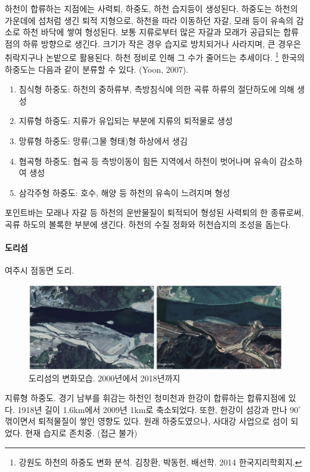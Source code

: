 하천이 합류하는 지점에는 사력퇴, 하중도, 하천 습지등이 생성된다.
하중도는 하천의 가운데에 섬처럼 생긴 퇴적 지형으로, 하천을 따라 이동하던 자갈, 모래 등이 유속의 감소로 하천 바닥에 쌓여 형성된다.
보통 지류로부터 많은 자갈과 모래가 공급되는 합류점의 하류 방향으로 생긴다.
크기가 작은 경우 습지로 방치되거나 사라지며, 큰 경우은 취락지구나 논밭으로 활용된다. 
하천 정비로 인해 그 수가 줄어드는 추세이다.
\footnote{강원도 하천의 하중도 변화 분석. 김창환, 박동헌, 배선학. 2014 한국지리학회지.}
한국의 하중도는 다음과 같이 분류할 수 있다. (Yoon, 2007).
\begin{enumerate}
    \item 침식형 하중도: 하천의 중하류부, 측방침식에 의한 곡류 하류의 절단하도에 의해 생성
    \item 지류형 하중도: 지류가 유입되는 부분에 지류의 퇴적물로 생성
    \item 망류형 하중도: 망류(그물 형태)형 하상에서 생김
    \item 협곡형 하중도: 협곡 등 측방이동이 힘든 지역에서 하천이 벗어나며 유속이 감소하여 생성
    \item 삼각주형 하중도: 호수, 해양 등 하천의 유속이 느려지며 형성
\end{enumerate}
포인트바는 모래나 자갈 등 하천의 운반물질이 퇴적되어 형성된 사력퇴의 한 종류로써, 곡류 하도의 볼록한 부분에 생긴다.
하천의 수질 정화와 허천습지의 조성을 돕는다.

\paragraph{도리섬}
여주시 점동면 도리.

\begin{figure}[ht]
    \centering
    \includegraphics[width=.8\textwidth]{img/도리섬.JPG}
    \caption{도리섬의 변화모습. 2000년에서 2018년까지 }
    \label{fig:my_labe611}
\end{figure}

지류형 하중도. 경기 남부를 휘감는 하천인 청미천과 한강이 합류하는 합류지점에 있다. 1918년 길이 1.6km에서 2009년 1km로 축소되었다.
또한, 한강이 섬강과 만나 $90^\circ$ 꺾이면서 퇴적물질이 쌓인 영향도 있다.
원래 하중도였으나, 사대강 사업으로 섬이 되었다. 현재 습지로 존치중. (접근 불가)

